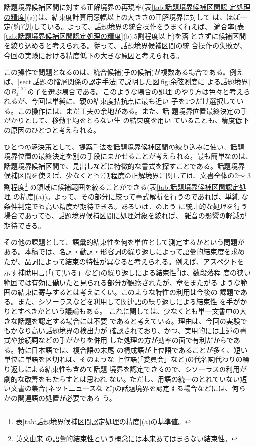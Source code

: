 話題境界候補区間に対する正解境界の再現率(表\ref{tab:話題境界候補区間認
  定処理の精度}(a))は、結束度計算用窓幅以上の大きさの正解境界に対して
は、ほぼ一定(約7割)している。よって、話題境界の統合操作をうまく行えば、
適合率(表\ref{tab:話題境界候補区間認定処理の精度}(b):5割程度以上)を落
とさずに候補区間を絞り込めると考えられる。従って、話題境界候補区間の統
合操作の失敗が、今回の実験における精度低下の大きな原因と考えられる。

この操作で問題となるのは、統合候補(子の候補)が複数ある場合である。例え
ば、\ref{sect:話題の階層関係の認定手法}で説明した図\ref{fig:余弦測度に
  よる話題境界}の$B^{(2)}_4$の子を選ぶ場合である。このような場合の処理
のやり方は色々と考えられるが、今回は単純に、親の結束度拮抗点に最も近い
子を1つだけ選択している。この操作には、まだ工夫の余地がある。また、話
題境界位置最終決定の手がかりとして、移動平均をとらない生
の結束度を用い
ていることも、精度低下の原因のひとつと考えられる。


ひとつの解決策として、提案手法を話題境界候補区間の絞り込みに使い、話題
境界位置の最終決定を別の手段にまかせることが考えられる。最も簡単なのは、
話題境界候補区間で、見出しなどに特徴的な書式を探すことである。話題境界
候補区間を使えば、少なくとも7割程度の正解境界に関しては、文書全体の2〜
3割程度\footnote{表\ref{tab:話題境界候補区間認定処理の精度}(a)の基準値。}
の領域に候補範囲を絞ることができる(表\ref{tab:話題境界候補区間認定処理
  の精度}(a))。よって、その部分に絞って書式解析を行うのであれば、単純
な条件判定でも高い精度が期待できる。あるいは、\cite{PNLP-2-P325}のよう
に統計的な処理を行う場合であっても、話題境界候補区間に処理対象を絞れば、
雑音の影響の軽減が期待できる。

その他の課題として、語彙的結束性を何を単位として測定するかという問題が
ある。本稿では、名詞・動詞・形容詞の繰り返しによって語彙的結束度を求め
たが、品詞によって結束の特性が異なると考えられる。例えば、アスペクトを
示す補助用言(「(て)いる」など)の繰り返しによる結束性\footnote{英文由来
  の語彙的結束性という概念には本来あてはまらない結束性。}は、数段落程
度の狭い範囲では有効に働いたと見られる部分が観察されたが、章をまたがる
ような範囲の結束に寄与するとは考えにくい。このような特性の利用は今後の
課題である。また、シソーラスなどを利用して関連語の繰り返しによる結束性
を手がかりとすべきか\cite{PACL-32-P9,COLING-98-P1481}という議論もある。
これに関しては、少なくとも単一文書中の大きな話題を認定する場合には不要
であると考えている。理由は、今回の実験でもかなり高い話題境界の検出力が
確認されており、かつ、実用的には上述の書式や接続詞などの手がかりを併用
した処理の方が効率の面で有利だからである。特に日本語では、複合語の末尾
の構成語が上位語であることが多く、短い単位に単語を区切れば、そのような
上位語(「委員会」など)の代名詞代わりの繰り返しによる結束性も含めて話題
境界を認定できるので、シソーラスの利用が劇的な改善をもたらすとは思われ
ない。ただし、用語の統一のとれていない短い文書の集合(ネットニュースな
ど)の話題境界を認定する場合などには、何らかの関連語の処置が必要であろ
う。


